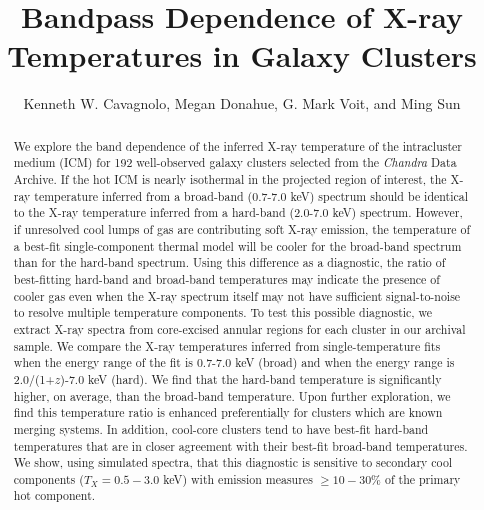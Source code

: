 \documentclass[12pt,preprint]{aastex}
\begin{document}
\title{Bandpass Dependence of X-ray Temperatures in Galaxy Clusters}
\author{Kenneth W. Cavagnolo, Megan
Donahue, G. Mark Voit, and Ming Sun}

\begin{abstract}

We explore the band dependence of the inferred X-ray temperature of
the intracluster medium (ICM) for 192 well-observed galaxy clusters
selected from the {\it Chandra} Data Archive. If
the hot ICM is nearly isothermal in the projected region
of interest, the X-ray temperature inferred from a broad-band
(0.7-7.0 keV) spectrum should be identical to the X-ray temperature
inferred from a hard-band (2.0-7.0 keV) spectrum. However, if 
unresolved cool lumps of gas are contributing soft X-ray emission, the
temperature of a best-fit single-component thermal model will be
cooler for the broad-band spectrum than for the hard-band spectrum. Using
this difference as a diagnostic, the ratio of best-fitting hard-band
and broad-band temperatures may indicate the presence of cooler gas even
when the X-ray spectrum itself may not have sufficient signal-to-noise
to resolve multiple temperature components. To test this possible
diagnostic, we extract X-ray spectra from core-excised annular regions
for each cluster in our archival sample. We compare the X-ray
temperatures inferred from single-temperature fits when the energy
range of the fit is 0.7-7.0 keV (broad) and when the energy range is
2.0/(1+$z$)-7.0 keV (hard). We find that the hard-band temperature is
significantly higher, on average, than the broad-band
temperature. Upon further exploration, we find this temperature ratio
is enhanced preferentially for clusters which are known merging
systems. In addition, cool-core clusters tend to have best-fit hard-band
temperatures that are in closer agreement with their best-fit broad-band
temperatures. We show, using simulated spectra, that this diagnostic is
sensitive to secondary cool components ($T_X = 0.5-3.0$ keV) with
emission measures $\geq 10-30\%$ of the primary hot component.
\end{abstract}

\end{document}
